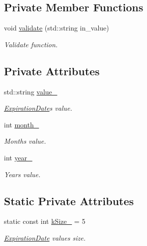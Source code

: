 \subsection*{Private Member Functions}
\begin{DoxyCompactItemize}
\item 
void \hyperlink{classExpirationDate_a14430408ff2aa0f9388b9a1d34e63029}{validate} (std\+::string in\+\_\+value)
\begin{DoxyCompactList}\small\item\em Validate function. \end{DoxyCompactList}\end{DoxyCompactItemize}
\subsection*{Private Attributes}
\begin{DoxyCompactItemize}
\item 
std\+::string \hyperlink{classExpirationDate_ad7f3f57106f31c50573fc15792f8f784}{value\+\_\+}
\begin{DoxyCompactList}\small\item\em \hyperlink{classExpirationDate}{Expiration\+Date}\textquotesingle{}s value. \end{DoxyCompactList}\item 
int \hyperlink{classExpirationDate_ad51648c09ae9ed6dfceb14a00324295a}{month\+\_\+}
\begin{DoxyCompactList}\small\item\em Month\textquotesingle{}s value. \end{DoxyCompactList}\item 
int \hyperlink{classExpirationDate_a8311d413f31ed2b108dce8e790506cd7}{year\+\_\+}
\begin{DoxyCompactList}\small\item\em Year\textquotesingle{}s value. \end{DoxyCompactList}\end{DoxyCompactItemize}
\subsection*{Static Private Attributes}
\begin{DoxyCompactItemize}
\item 
static const int \hyperlink{classExpirationDate_a33ebe65d3c314fc67fd972a0969b6a21}{k\+Size\+\_\+} = 5
\begin{DoxyCompactList}\small\item\em \hyperlink{classExpirationDate}{Expiration\+Date} value\textquotesingle{}s size. \end{DoxyCompactList}\end{DoxyCompactItemize}


